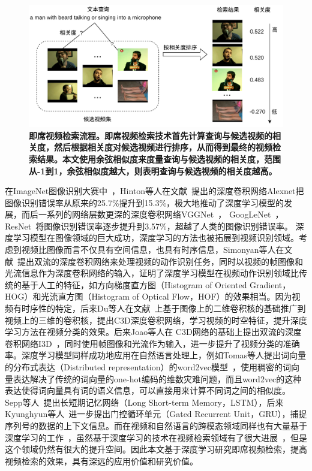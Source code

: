\begin{figure}[tbh!]
    \centering
    \includegraphics[width=\linewidth]{figures/1}
    \caption[即席视频检索流程]{\textbf{即席视频检索流程。即席视频检索技术首先计算查询与候选视频的相关度，然后根据相关度对候选视频进行排序，从而得到最终的视频检索结果。本文使用余弦相似度来度量查询与候选视频的相关度，范围从-1到1，余弦相似度越大，则表明查询与候选视频的相关度越高。}}
    \label{fig:fig_1}
\end{figure}

在ImageNet图像识别大赛中~\cite{deng2009imagenet}，Hinton等人在文献~\cite{krizhevsky2012imagenet}提出的深度卷积网络Alexnet把图像识别错误率从原来的25.7\%提升到15.3\%，极大地推动了深度学习模型的发展，而后一系列的网络层数更深的深度卷积网络VGGNet~\cite{simonyan2014very}，
GoogLeNet~\cite{szegedy2015going}，ResNet~\cite{he2016deep}将图像识别错误率逐步提升到3.57\%，超越了人类的图像识别错误率。
深度学习模型在图像领域的巨大成功，深度学习的方法也被拓展到视频识别领域。考虑到视频比图像而言不仅具有空间信息，也具有时序信息，Simonyan等人在文献~\cite{simonyan2014two}提出双流的深度卷积网络来处理视频的动作识别任务，同时以视频的帧图像和光流信息作为深度卷积网络的输入，证明了深度学习模型在视频动作识别领域比传统的基于人工的特征，如方向梯度直方图（Histogram of Oriented Gradient，HOG）和光流直方图（Histogram of Optical Flow，HOF）的效果相当。因为视频有时序性的特定，后来Du等人在文献~\cite{tran2015learning}上基于图像上的二维卷积核的基础推广到视频上的三维的卷积核，提出C3D深度卷积网络，学习视频的时空特征，提升深度学习方法在视频分类的效果。后来Joao等人在
C3D网络的基础上提出双流的深度卷积网络I3D~\cite{carreira2017quo}，同时使用帧图像和光流作为输入，进一步提升了视频分类的准确率。深度学习模型同样成功地应用在自然语言处理上，例如Tomas等人提出词向量的分布式表达（Distributed representation）的word2vec模型~\cite{mikolov2013distributed}，使用稠密的词向量表达解决了传统的词向量的one-hot编码的维数灾难问题，而且word2vec的这种表达使得词向量具有词的语义信息，可以直接用来计算不同词之间的相似度。Sepp等人~\cite{hochreiter1997long}提出长短期记忆网络（Long Short-term Memory，LSTM），后来Kyunghyun等人~\cite{cho2014learning}进一步提出门控循环单元（Gated Recurrent Unit，GRU），捕捉序列号的数据的上下文信息。而在视频和自然语言的跨模态领域同样也有大量基于深度学习的工作~\cite{venugopalan2015sequence,yao2015describing,otani2016learning,dong2018predicting,sun2019videobert,miech2019howto100m}，虽然基于深度学习的技术在视频检索领域有了很大进展~\cite{mithun2018learning,miech2018learning,dong2019dual,liu2019use}，但是这个领域仍然有很大的提升空间。因此本文基于深度学习研究即席视频检索，提高视频检索的效果，具有深远的应用价值和研究价值。


